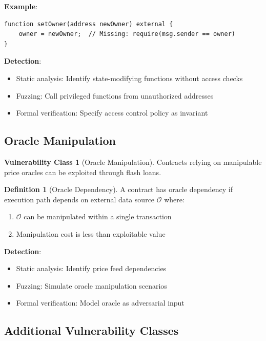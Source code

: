 \documentclass[11pt,a4paper]{article}
\theoremstyle{definition}
\newtheorem{definition}{Definition}
\newtheorem{vulnerability}{Vulnerability Class}
\begin{document}
\textbf{Example}:
\begin{lstlisting}
function setOwner(address newOwner) external {
    owner = newOwner;  // Missing: require(msg.sender == owner)
}
\end{lstlisting}

\textbf{Detection}:
\begin{itemize}
    \item Static analysis: Identify state-modifying functions without access checks
    \item Fuzzing: Call privileged functions from unauthorized addresses
    \item Formal verification: Specify access control policy as invariant
\end{itemize}

\subsection{Oracle Manipulation}

\begin{vulnerability}[Oracle Manipulation]
Contracts relying on manipulable price oracles can be exploited through flash loans.
\end{vulnerability}

\begin{definition}[Oracle Dependency]
A contract has oracle dependency if execution path depends on external data source $\mathcal{O}$ where:
\begin{enumerate}
    \item $\mathcal{O}$ can be manipulated within a single transaction
    \item Manipulation cost is less than exploitable value
\end{enumerate}
\end{definition}

\textbf{Detection}:
\begin{itemize}
    \item Static analysis: Identify price feed dependencies
    \item Fuzzing: Simulate oracle manipulation scenarios
    \item Formal verification: Model oracle as adversarial input
\end{itemize}

\subsection{Additional Vulnerability Classes}
\end{document}
